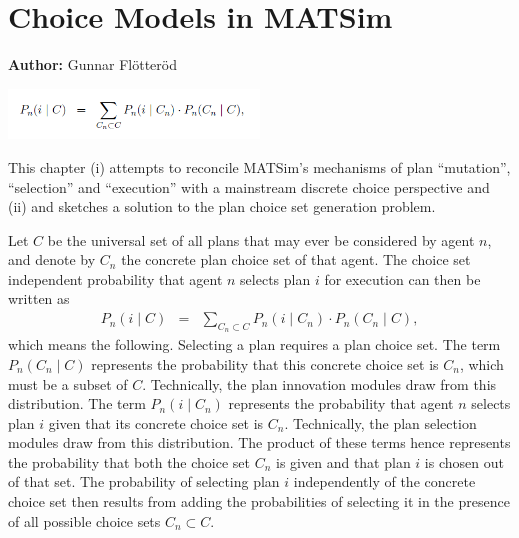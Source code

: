 \chapter{Choice Models in MATSim}
\label{ch:discretechoice}

\hfill \textbf{Author:} Gunnar Flötteröd

\begin{center} \includegraphics[width=0.5\textwidth, angle=0]{understanding/figures/dc.png} \end{center}

This chapter (i) attempts to reconcile MATSim's mechanisms of plan
{}``mutation'', {}``selection'' and {}``execution'' with a mainstream
discrete choice perspective and (ii) and sketches a solution to the
plan choice set generation problem.

Let $C$ be the universal set of all plans that may ever be considered
by agent $n$, and denote by $C_{n}$ the concrete plan choice set
of that agent. The choice set independent probability that agent $n$
selects plan $i$ for execution can then be written as
\begin{eqnarray}
P_{n}(i\mid C) & = & \sum_{C_{n}\subset C}P_{n}(i\mid C_{n})\cdot P_{n}(C_{n}\mid C),\label{eq:unconditional-choice-proba}
\end{eqnarray}
which means the following. Selecting a plan requires a plan choice
set. The term $P_{n}(C_{n}\mid C)$ represents the probability that
this concrete choice set is $C_{n}$, which must be a subset of $C$.
Technically, the plan innovation modules draw from this distribution.
The term $P_{n}(i\mid C_{n})$ represents the probability that agent
$n$ selects plan $i$ given that its concrete choice set is $C_{n}$.
Technically, the plan selection modules draw from this distribution.
The product of these terms hence represents the probability that both
the choice set $C_{n}$ is given and that plan $i$ is chosen out
of that set. The probability of selecting plan $i$ independently
of the concrete choice set then results from adding the probabilities
of selecting it in the presence of all possible choice sets $C_{n}\subset C$.

